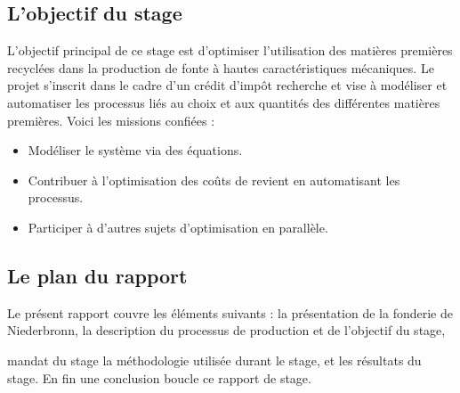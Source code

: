 \documentclass[12pt]{article}
\begin{document}





\subsection{L'objectif du stage }


L’objectif principal de ce stage est d’optimiser l’utilisation des matières 
premières recyclées dans la production de fonte à hautes caractéristiques 
mécaniques. Le projet s’inscrit dans le cadre d’un crédit d’impôt recherche 
et vise à modéliser et automatiser les processus liés au choix et aux 
quantités des différentes matières premières. Voici les missions confiées :

\begin{itemize}
    \item Modéliser le système via des équations.
    \item Contribuer à l’optimisation des coûts de revient en 
    automatisant les processus.
    \item Participer à d’autres sujets d’optimisation en parallèle.
\end{itemize}





\subsection{Le plan du rapport}

Le présent rapport couvre les éléments suivants : la présentation de 
la fonderie de Niederbronn, la description du processus 
de production et de l'objectif du stage, 

mandat du stage la méthodologie utilisée durant le stage, et les résultats du stage. En
fin une conclusion boucle ce rapport de stage.
\end{document}
